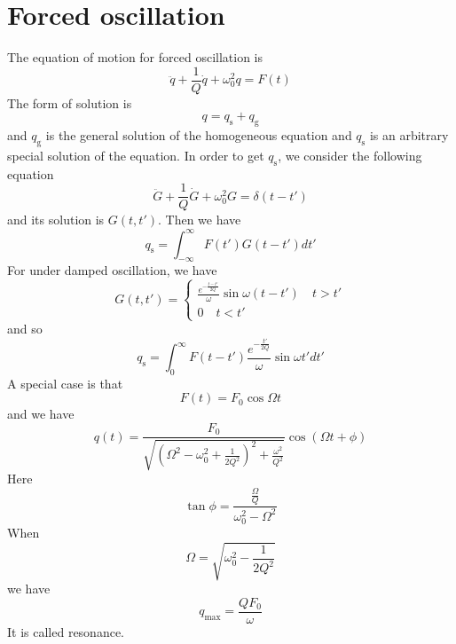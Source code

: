 \section{Forced oscillation}
The equation of motion for forced oscillation is
\[\ddot{q} + \frac{1}{Q}\dot{q} + \omega_0^2 q = F(t)\]
The form of solution is
\[q = q_{\mathrm{s}} + q_{\mathrm{g}}\]
and $q_{\mathrm{g}}$ is the general solution of the homogeneous equation and $q_{\mathrm{s}}$ is an arbitrary special solution of the equation. In order to get $q_{\mathrm{s}}$, we consider the following equation
\[\ddot{G} + \frac{1}{Q}\dot{G} + \omega_0^2 G = \delta(t-t')\]
and its solution is $G(t,t')$.
Then we have
\[q_{\mathrm{s}} = \int_{-\infty}^{\infty} F(t')G(t-t')dt'\]
For under damped oscillation, we have
\[G(t,t') = \begin{cases} \frac{e^{-\frac{t-t'}{2Q}}}{\omega} \sin\omega(t-t') \quad t>t'\\ 0 \quad t<t'\end{cases} \]
and so
\[q_{\mathrm{s}} = \int_{0}^{\infty} F(t-t') \frac{e^{-\frac{t'}{2Q}}}{\omega} \sin\omega t' dt'\]
A special case is that
\[F(t) = F_0 \cos\Omega t\]
and we have
\[q(t) = \frac{F_0}{\sqrt{(\Omega^2 - \omega_0^2 + \frac{1}{2Q^2})^2 + \frac{\omega^2}{Q^2}}} \cos(\Omega t + \phi)\]
Here
\[\tan \phi = \frac{\frac{\Omega}{Q}}{\omega_0^2 - \Omega^2}\]
When
\[\Omega = \sqrt{\omega_0^2 - \frac{1}{2Q^2}}\]
we have
\[q_{\mathrm{max}} = \frac{QF_0}{\omega}\]
It is called resonance. 

